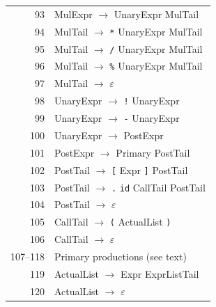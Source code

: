 \documentclass[12pt,a4paper]{article}
\begin{document}
\begin{longtable}{rp{11cm}}
93 & MulExpr $\rightarrow$ UnaryExpr MulTail \\
94 & MulTail $\rightarrow$ \texttt{*} UnaryExpr MulTail \\
95 & MulTail $\rightarrow$ \texttt{/} UnaryExpr MulTail \\
96 & MulTail $\rightarrow$ \texttt{\%} UnaryExpr MulTail \\
97 & MulTail $\rightarrow$ $\varepsilon$ \\
98 & UnaryExpr $\rightarrow$ \texttt{!} UnaryExpr \\
99 & UnaryExpr $\rightarrow$ \texttt{-} UnaryExpr \\
100 & UnaryExpr $\rightarrow$ PostExpr \\
101 & PostExpr $\rightarrow$ Primary PostTail \\
102 & PostTail $\rightarrow$ \texttt{[} Expr \texttt{]} PostTail \\
103 & PostTail $\rightarrow$ \texttt{.} \texttt{id} CallTail PostTail \\
104 & PostTail $\rightarrow$ $\varepsilon$ \\
105 & CallTail $\rightarrow$ \texttt{(} ActualList \texttt{)} \\
106 & CallTail $\rightarrow$ $\varepsilon$ \\
107--118 & Primary productions (see text) \\
119 & ActualList $\rightarrow$ Expr ExprListTail \\
120 & ActualList $\rightarrow$ $\varepsilon$ \\
\end{longtable}
\end{document}
